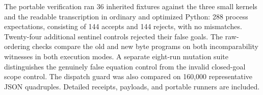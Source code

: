 The portable verification ran 36 inherited fixtures against the three
small kernels and the readable transcription in ordinary and optimized
Python: 288 process expectations, consisting of 144 accepts and 144
rejects, with no mismatches. Twenty-four additional sentinel controls
rejected their false goals. The raw-ordering checks compare the old and
new byte programs on both incomparability witnesses in both execution
modes. A separate eight-run mutation suite distinguishes the genuinely
false equation control from the invalid closed-goal scope control.
The dispatch guard was also compared on 160,000 representative JSON
quadruples. Detailed receipts, payloads, and portable runners are included.
